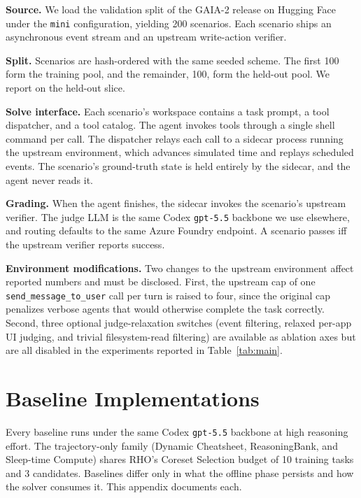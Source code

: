 \documentclass{llmxive}
\providecommand{\method}{\textsc{RHO}}
\begin{document}
\noindent\textbf{Source.}
We load the validation split of the GAIA-2 release on Hugging Face under the \texttt{mini} configuration, yielding 200 scenarios.
Each scenario ships an asynchronous event stream and an upstream write-action verifier.

\noindent\textbf{Split.}
Scenarios are hash-ordered with the same seeded scheme.
The first 100 form the training pool, and the remainder, 100, form the held-out pool.
We report on the held-out slice.

\noindent\textbf{Solve interface.}
Each scenario's workspace contains a task prompt, a tool dispatcher, and a tool catalog.
The agent invokes tools through a single shell command per call.
The dispatcher relays each call to a sidecar process running the upstream environment, which advances simulated time and replays scheduled events.
The scenario's ground-truth state is held entirely by the sidecar, and the agent never reads it.

\noindent\textbf{Grading.}
When the agent finishes, the sidecar invokes the scenario's upstream verifier.
The judge LLM is the same Codex \texttt{gpt-5.5} backbone we use elsewhere, and routing defaults to the same Azure Foundry endpoint.
A scenario passes iff the upstream verifier reports success.

\noindent\textbf{Environment modifications.}
Two changes to the upstream environment affect reported numbers and must be disclosed.
First, the upstream cap of one \texttt{send\_message\_to\_user} call per turn is raised to four, since the original cap penalizes verbose agents that would otherwise complete the task correctly.
Second, three optional judge-relaxation switches (event filtering, relaxed per-app UI judging, and trivial filesystem-read filtering) are available as ablation axes but are all disabled in the experiments reported in Table~\ref{tab:main}.

\section{Baseline Implementations}\label{app:baselines}

 Every baseline runs under the same Codex \texttt{gpt-5.5} backbone at high reasoning effort.
The trajectory-only family (Dynamic Cheatsheet, ReasoningBank, and Sleep-time Compute) shares \method{}'s Coreset Selection budget of 10 training tasks and 3 candidates.
Baselines differ only in what the offline phase persists and how the solver consumes it.
This appendix documents each.
\end{document}
